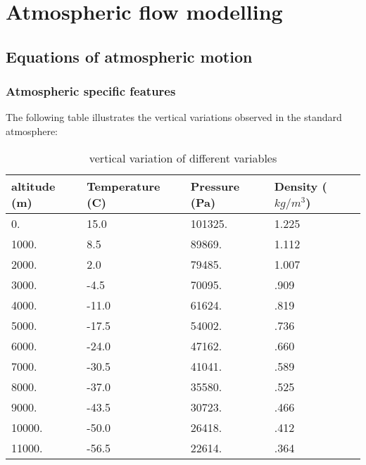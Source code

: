 \section{Atmospheric flow modelling}

\subsection{Equations of atmospheric motion}

\subsubsection{Atmospheric specific features}

The following table illustrates the vertical
variations observed in the standard atmosphere:


\begin{table}[htbp]

\begin{center}

\caption[Variation]{vertical variation of different variables}

\begin{tabular}{|l|l|l|l|}

\hline

altitude \newline
  (\si{m})&
  Temperature (\si{C})&
Pressure \newline
  (\si{Pa})&
Density \newline
  ($\si{kg/m^{3}}$) \\

\hline
0.&
15.0&
101325.&
1.225 \\
\hline
1000.&
8.5&
89869.&
1.112 \\
\hline
2000.&
2.0&
79485.&
1.007 \\
\hline
3000.&
-4.5&
70095.&
.909 \\
\hline
4000.&
-11.0&
61624.&
.819 \\
\hline
5000.&
-17.5&
54002.&
.736 \\
\hline
6000.&
-24.0&
47162.&
.660 \\
\hline
7000.&
-30.5&
41041.&
.589 \\
\hline
8000.&
-37.0&
35580.&
.525 \\
\hline
9000.&
-43.5&
30723.&
.466 \\
\hline
10000.&
-50.0&
26418.&
.412 \\
\hline
11000.&
-56.5&
22614.&
.364 \\
\hline


\end{tabular}
\label{tab:atmo:tab1}
\end{center}
\end{table}

